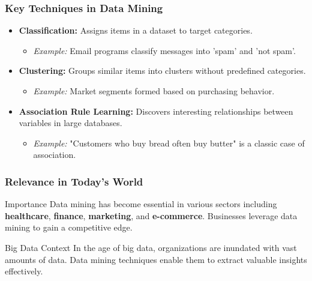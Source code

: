 \documentclass[aspectratio=169]{beamer}
\begin{document}
\begin{frame}[fragile]
    \frametitle{Key Techniques in Data Mining}
    \begin{itemize}
        \item \textbf{Classification:} Assigns items in a dataset to target categories.  
        \begin{itemize}
            \item \textit{Example:} Email programs classify messages into 'spam' and 'not spam'.
        \end{itemize}
        
        \item \textbf{Clustering:} Groups similar items into clusters without predefined categories.  
        \begin{itemize}
            \item \textit{Example:} Market segments formed based on purchasing behavior.
        \end{itemize}
        
        \item \textbf{Association Rule Learning:} Discovers interesting relationships between variables in large databases.  
        \begin{itemize}
            \item \textit{Example:} "Customers who buy bread often buy butter" is a classic case of association.
        \end{itemize}
    \end{itemize}
\end{frame}

\begin{frame}[fragile]
    \frametitle{Relevance in Today’s World}
    \begin{block}{Importance}
        Data mining has become essential in various sectors including \textbf{healthcare}, \textbf{finance}, \textbf{marketing}, and \textbf{e-commerce}. Businesses leverage data mining to gain a competitive edge.
    \end{block}

    \begin{block}{Big Data Context}
        In the age of big data, organizations are inundated with vast amounts of data. Data mining techniques enable them to extract valuable insights effectively.
    \end{block}
\end{frame}
\end{document}
